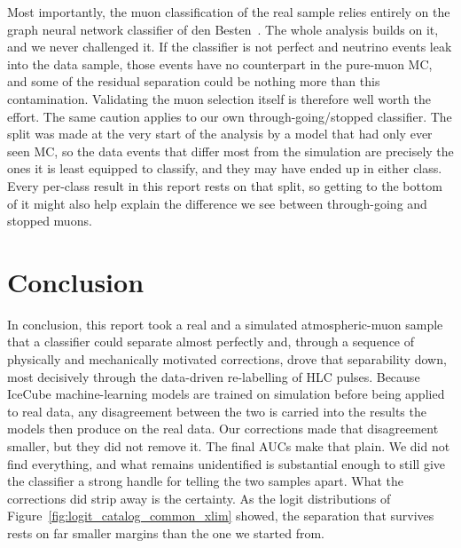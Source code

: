 Most importantly, the muon classification of the real sample relies entirely on
the graph neural network classifier of den Besten~\cite{DenBestenPrivate}. The
whole analysis builds on it, and we never challenged it. If the classifier is
not perfect and neutrino events leak into the data sample, those events have no
counterpart in the pure-muon MC, and some of the residual separation could be
nothing more than this contamination. Validating the muon selection itself is
therefore well worth the effort. The same caution applies to our own
through-going/stopped classifier. The split was made at the very start of the
analysis by a model that had only ever seen MC, so the data events that differ
most from the simulation are precisely the ones it is least equipped to
classify, and they may have ended up in either class. Every per-class result in
this report rests on that split, so getting to the bottom of it might also help
explain the difference we see between through-going and stopped muons.

\section{Conclusion}

In conclusion, this report took a real and a simulated atmospheric-muon sample
that a classifier could separate almost perfectly and, through a sequence of
physically and mechanically motivated corrections, drove that separability down,
 most decisively through the data-driven re-labelling of HLC
pulses. Because IceCube machine-learning models are trained on simulation
before being applied to real data, any disagreement between the two is carried
into the results the models then produce on the real data. Our corrections made that
disagreement smaller, but they did not remove it. The final AUCs make that plain. We did not find everything,
and what remains unidentified is substantial enough to still give the
classifier a strong handle for telling the two samples apart. What the
corrections did strip away is the certainty. As the logit distributions of
Figure~\ref{fig:logit_catalog_common_xlim} showed, the separation that survives
rests on far smaller margins than the one we started from.
